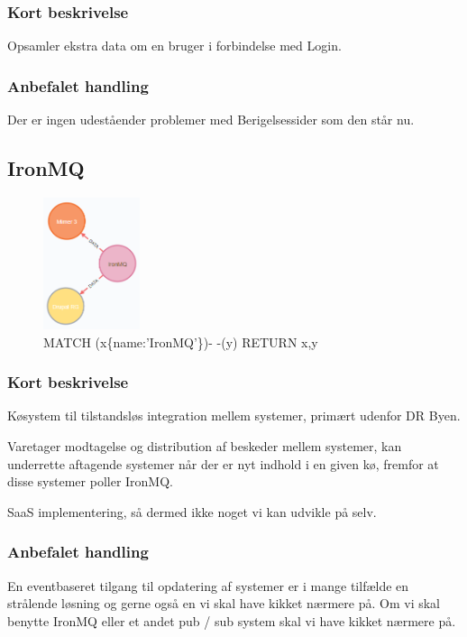 \documentclass{article}
\begin{document}
\subsubsection*{Kort beskrivelse}
Opsamler ekstra data om en bruger i forbindelse med Login.
\subsubsection*{Anbefalet handling}
Der er ingen udeståender problemer med Berigelsessider som den står nu.



\subsection{IronMQ}
\begin{figure}[h]
\includegraphics[width=80pt]{IronMQ.PNG}
\caption{MATCH (x\{name:'IronMQ'\})- -(y) RETURN x,y}
\end{figure}
\subsubsection*{Kort beskrivelse}
Køsystem til tilstandsløs integration mellem systemer, primært udenfor DR Byen.

Varetager modtagelse og distribution af beskeder mellem systemer, kan underrette aftagende systemer når der er nyt indhold i en given kø, fremfor at disse systemer poller IronMQ.

SaaS implementering, så dermed ikke noget vi kan udvikle på selv.
\subsubsection*{Anbefalet handling}
En eventbaseret tilgang til opdatering af systemer er i mange tilfælde en strålende løsning og gerne også en vi skal have kikket nærmere på. Om vi skal benytte IronMQ eller et andet pub / sub system skal vi have kikket nærmere på.
\end{document}
